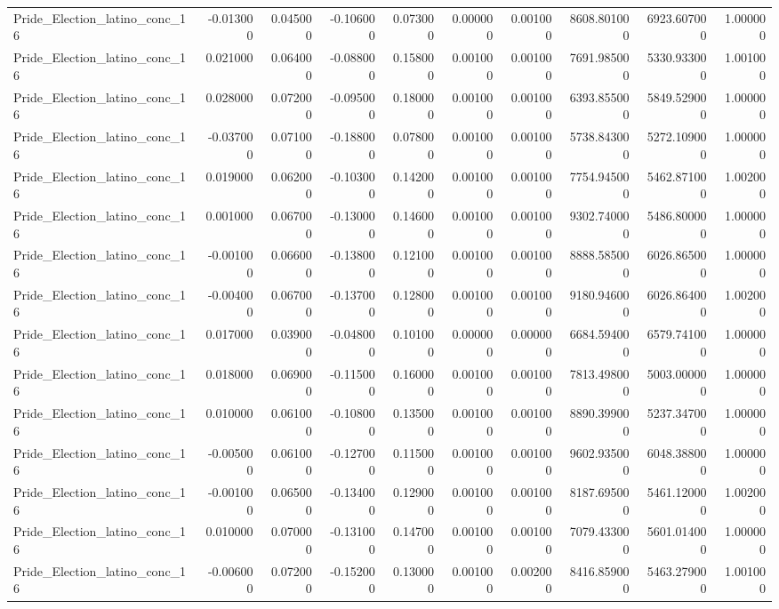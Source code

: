 \begin{table}
\begin{tabular}{lrrrrrrrrr}
Pride_Election_latino_conc_16 & -0.013000 & 0.045000 & -0.106000 & 0.073000 & 0.000000 & 0.001000 & 8608.801000 & 6923.607000 & 1.000000 \\
Pride_Election_latino_conc_16 & 0.021000 & 0.064000 & -0.088000 & 0.158000 & 0.001000 & 0.001000 & 7691.985000 & 5330.933000 & 1.001000 \\
Pride_Election_latino_conc_16 & 0.028000 & 0.072000 & -0.095000 & 0.180000 & 0.001000 & 0.001000 & 6393.855000 & 5849.529000 & 1.000000 \\
Pride_Election_latino_conc_16 & -0.037000 & 0.071000 & -0.188000 & 0.078000 & 0.001000 & 0.001000 & 5738.843000 & 5272.109000 & 1.000000 \\
Pride_Election_latino_conc_16 & 0.019000 & 0.062000 & -0.103000 & 0.142000 & 0.001000 & 0.001000 & 7754.945000 & 5462.871000 & 1.002000 \\
Pride_Election_latino_conc_16 & 0.001000 & 0.067000 & -0.130000 & 0.146000 & 0.001000 & 0.001000 & 9302.740000 & 5486.800000 & 1.000000 \\
Pride_Election_latino_conc_16 & -0.001000 & 0.066000 & -0.138000 & 0.121000 & 0.001000 & 0.001000 & 8888.585000 & 6026.865000 & 1.000000 \\
Pride_Election_latino_conc_16 & -0.004000 & 0.067000 & -0.137000 & 0.128000 & 0.001000 & 0.001000 & 9180.946000 & 6026.864000 & 1.002000 \\
Pride_Election_latino_conc_16 & 0.017000 & 0.039000 & -0.048000 & 0.101000 & 0.000000 & 0.000000 & 6684.594000 & 6579.741000 & 1.000000 \\
Pride_Election_latino_conc_16 & 0.018000 & 0.069000 & -0.115000 & 0.160000 & 0.001000 & 0.001000 & 7813.498000 & 5003.000000 & 1.000000 \\
Pride_Election_latino_conc_16 & 0.010000 & 0.061000 & -0.108000 & 0.135000 & 0.001000 & 0.001000 & 8890.399000 & 5237.347000 & 1.000000 \\
Pride_Election_latino_conc_16 & -0.005000 & 0.061000 & -0.127000 & 0.115000 & 0.001000 & 0.001000 & 9602.935000 & 6048.388000 & 1.000000 \\
Pride_Election_latino_conc_16 & -0.001000 & 0.065000 & -0.134000 & 0.129000 & 0.001000 & 0.001000 & 8187.695000 & 5461.120000 & 1.002000 \\
Pride_Election_latino_conc_16 & 0.010000 & 0.070000 & -0.131000 & 0.147000 & 0.001000 & 0.001000 & 7079.433000 & 5601.014000 & 1.000000 \\
Pride_Election_latino_conc_16 & -0.006000 & 0.072000 & -0.152000 & 0.130000 & 0.001000 & 0.002000 & 8416.859000 & 5463.279000 & 1.001000 \\

\end{tabular}
\end{table}
